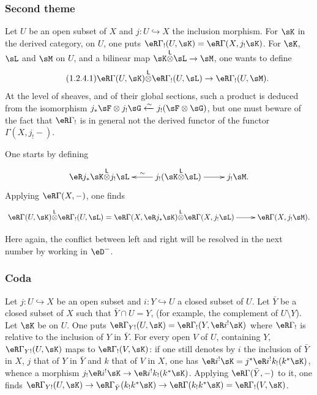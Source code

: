 \subsubsection{Second theme}\label{IV:1-2-4}

Let $U$ be an open subset of $X$ and $j:U\hookrightarrow X$ the inclusion morphism.
For $\sK$ in the derived category, on $U$, one puts
$\eR\Gamma_!(U,\sK)=\eR\Gamma(X,j_!\sK)$. For $\sK$, $\sL$ and $\sM$ on $U$, and
a bilinear map $\sK\lotimes\sL\to\sM$, one wants to define
\begin{equation*}\tag{1.2.4.1}\label{IV:eq:1-2-4-1}
  \eR\Gamma(U,\sK)\lotimes\eR\Gamma_!(U,\sL)\to\eR\Gamma_!(U,\sM) \text{.}
\end{equation*}
At the level of sheaves, and of their global sections, such a product is
deduced from the isomorphism
$j_*\sF\otimes j_!\sG\xleftarrow\sim j_!(\sF\otimes \sG)$, but one must beware
of the fact that $\eR\Gamma_!$ is in general not the derived functor of the
functor $\Gamma(X,j_!-)$.

One starts by defining
\[\xymatrix{
  \eR j_* \sK\lotimes j_! \sL
    & \ar[l]_-\sim j_!(\sK\lotimes \sL) \ar[r]
    & j_!\sM \text{.}
}\]
Applying $\eR\Gamma(X,-)$, one finds
\[\xymatrix{
  \eR\Gamma(U,\sK)\lotimes\eR\Gamma_!(U,\sL) = \eR\Gamma(X,\eR j_*\sK)\lotimes \eR\Gamma(X,j_!\sL) \ar[r]
    & \eR\Gamma(X,j_! \sM) \text{.}
}\]

Here again, the conflict between left and right will be resolved in the next
number by working in $\eD^-$.




\subsubsection{Coda}\label{IV:1-2-5}

Let $j:U\hookrightarrow X$ be an open subset and $i:Y\hookrightarrow U$ a
closed subset of $U$. Let $\bar Y$ be a closed subset of $X$ such that
$\bar Y\cap U=Y$, (for example, the complement of $U\setminus Y$). Let $\sK$
be on $U$. One puts $\eR\Gamma_{Y!}(U,\sK)=\eR\Gamma_!(Y,\eR i^!\sK)$ where
$\eR\Gamma_!$ is relative to the inclusion of $Y$ in $\bar Y$. For every open
$V$ of $U$, containing $Y$, $\eR\Gamma_{Y!}(U,\sK)$ maps to
$\eR\Gamma_!(V,\sK)$: if one still denotes by $i$ the inclusion of $\bar Y$ in $X$,
$j$ that of $Y$ in $\bar Y$ and $k$ that of $V$ in $X$, one has
$\eR i^!\sK = j^*\eR i^! k_!(k^*\sK)$, whence a morphism
$j_!\eR i^!\sK \to \eR i^! k_!(k^*\sK)$. Applying
$\eR\Gamma(\bar Y,-)$ to it, one finds
$\eR\Gamma_{Y!}(U,\sK)\to \eR\Gamma_{\bar Y}(k_! k^* \sK) \to \eR\Gamma(k_! k^*\sK) = \eR\Gamma_!(V,\sK)$.


